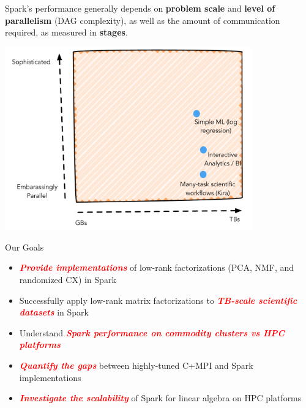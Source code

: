 \documentclass[xcolor=x11names,compress,ignorenonframetext,10pt]{beamer}
\renewcommand{\(}{\begin{columns}}
\renewcommand{\)}{\end{columns}}
\newcommand{\<}[1]{\begin{column}{#1}}
\renewcommand{\>}{\end{column}}
\newcommand{\redemphasis}[1]{\textbf{\textit{\textcolor{red}{#1}}}}
\begin{document}
\begin{frame}
  Spark's performance generally depends on \textbf{problem scale} and \textbf{level of parallelism} (DAG complexity),
  as well as the amount of communication required, as measured in \textbf{stages}. 
  \begin{center}
  \includegraphics[width=0.8\textwidth]{figures/spark/spark-usage}
  \end{center}
\end{frame}

\begin{frame}{Our Goals}
  \begin{itemize}
    \item \redemphasis{Provide implementations} of low-rank factorizations (PCA, NMF, and randomized CX) in Spark
    \item Successfully apply low-rank matrix factorizations to \redemphasis{TB-scale scientific datasets} in Spark
    \item Understand \redemphasis{Spark performance on commodity clusters vs HPC platforms}
    \item \redemphasis{Quantify the gaps} between highly-tuned C+MPI and Spark implementations
    \item \redemphasis{Investigate the scalability} of Spark for linear algebra on HPC platforms
  \end{itemize}
\end{frame}
\end{document}
